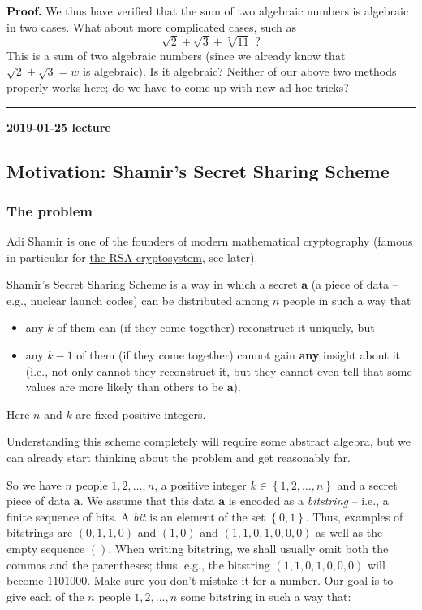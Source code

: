 \documentclass[numbers=enddot,12pt,final,onecolumn,notitlepage]{scrartcl}%
\numberwithin{exer}{subsection}
\theoremstyle{definition}
\newenvironment{proof}[1][Proof]{\noindent\textbf{#1.} }{\ \rule{0.5em}{0.5em}}
\begin{document}
\begin{proof}
We thus have verified that the sum of two algebraic numbers is algebraic in
two cases. What about more complicated cases, such as
\[
\sqrt{2}+\sqrt{3}+\sqrt[7]{11}\text{ ?}%
\]
This is a sum of two algebraic numbers (since we already know that $\sqrt
{2}+\sqrt{3}=w$ is algebraic). Is it algebraic? Neither of our above two
methods properly works here; do we have to come up with new ad-hoc tricks?
\end{proof}

\begin{center}
\textbf{2019-01-25 lecture}
\end{center}

\subsection{Motivation: Shamir's Secret Sharing Scheme}

\subsubsection{The problem}

Adi Shamir is one of the founders of modern mathematical cryptography (famous
in particular for \href{https://en.wikipedia.org/wiki/RSA_(cryptosystem)}{the
RSA cryptosystem}, see later).

Shamir's Secret Sharing Scheme is a way in which a secret $\mathbf{a}$ (a
piece of data -- e.g., nuclear launch codes) can be distributed among $n$
people in such a way that

\begin{itemize}
\item any $k$ of them can (if they come together) reconstruct it uniquely, but

\item any $k-1$ of them (if they come together) cannot gain \textbf{any}
insight about it (i.e., not only cannot they reconstruct it, but they cannot
even tell that some values are more likely than others to be $\mathbf{a}$).
\end{itemize}

Here $n$ and $k$ are fixed positive integers.

Understanding this scheme completely will require some abstract algebra, but
we can already start thinking about the problem and get reasonably far.

So we have $n$ people $1,2,\ldots,n$, a positive integer $k\in\left\{
1,2,\ldots,n\right\}  $ and a secret piece of data $\mathbf{a}$. We assume
that this data $\mathbf{a}$ is encoded as a \textit{bitstring} -- i.e., a
finite sequence of bits. A \textit{bit} is an element of the set $\left\{
0,1\right\}  $. Thus, examples of bitstrings are $\left(  0,1,1,0\right)  $
and $\left(  1,0\right)  $ and $\left(  1,1,0,1,0,0,0\right)  $ as well as the
empty sequence $\left(  {}\right)  $. When writing bitstring, we shall usually
omit both the commas and the parentheses; thus, e.g., the bitstring $\left(
1,1,0,1,0,0,0\right)  $ will become $1101000$. Make sure you don't mistake it
for a number. Our goal is to give each of the $n$ people $1,2,\ldots,n$ some
bitstring in such a way that:
\end{document}
